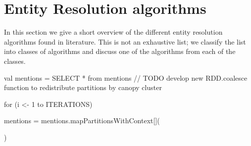 



\section{Entity Resolution algorithms}


In this section we give a short overview of the different entity resolution algorithms found in literature.
This is not an exhaustive list; we classify the list into classes of algorithms and discuss one of the algorithms from each of the classes.










  val mentions = SELECT * from mentions
  // TODO develop new RDD.coalesce function to redistribute partitions by canopy cluster

  for (i <- 1 to ITERATIONS) {
    
    mentions = mentions.mapPartitionsWithContext[](

    )

  }







